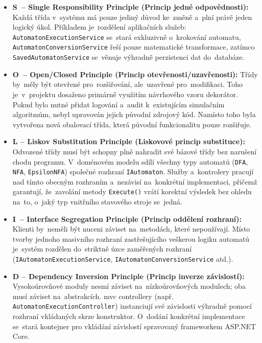 \documentclass[
  master,
  program=ainfvs,
  printversion,
  figures=false,
  tables=false,
  glossaries,
  index
]{kidiplom}
\begin{document}
\begin{itemize}
    \item \textbf{S~-- Single Responsibility Principle (Princip jedné odpovědnosti):} 
    Každá třída v~systému má pouze jediný důvod ke~změně a~plní právě jeden logický úkol. Příkladem je~rozdělení aplikačních služeb: \texttt{Au\-to\-ma\-ton\-Exe\-cution\-Service} se~stará exkluzivně o~krokování automatu, \texttt{Au\-to\-ma\-ton\-Con\-ver\-sion\-Service} řeší pouze matematické transformace, zatímco \texttt{Sa\-ved\-Au\-to\-ma\-ton\-Service} se~věnuje výhradně perzistenci dat do~databáze.

    \item \textbf{O~-- Open/Closed Principle (Princip otevřenosti/uzavřenosti):} 
    Třídy by~měly být otevřené pro~rozšiřování, ale~uzavřené pro~modifikaci. Toho je~v~projektu dosaženo primárně využitím návrhového vzoru dekorátor. Pokud bylo nutné přidat logování a~audit k~existujícím simulačním algoritmům, nebyl upravován jejich původní zdrojový kód. Namísto toho byla vytvořena nová obalovací třída, která původní funkcionalitu pouze rozšiřuje.

    \item \textbf{L -- Liskov Substitution Principle (Liskovové princip substituce):} 
    Odvozené třídy musí být schopny plně nahradit své bázové třídy bez narušení chodu programu. V~doménovém modelu sdílí všechny typy automatů (\texttt{DFA}, \texttt{NFA}, \texttt{EpsilonNFA}) společné rozhraní \texttt{IAutomaton}. Služby a~kontrolery pracují nad tímto obecným rozhraním a~nezávisí na~konkrétní implementaci, přičemž garantují, že~zavolání metody \texttt{Execute()} vrátí korektní výsledek bez ohledu na~to, o~jaký typ vnitřního stavového stroje se~jedná.

    \item \textbf{I~-- Interface Segregation Principle (Princip oddělení rozhraní):} 
    Klienti by~neměli být nuceni záviset na~metodách, které nepoužívají. Místo tvorby jednoho masivního rozhraní zastřešujícího veškerou logiku automatů je~systém rozdělen do~striktně úzce zaměřených rozhraní (\texttt{IAutomaton\-Execution\-Service}, \texttt{IAutomaton\-Conversion\-Service} atd.).

    \item \textbf{D -- Dependency Inversion Principle (Princip inverze závislostí):} 
    Vysokoúrovňové moduly nesmí záviset na~nízkoúrovňových modulech; oba musí záviset na~abstrakcích. \gls{mvc} controllery (např. \texttt{Automaton\-Exe\-cu\-ti\-on\-Con\-tro\-ller}) instanciují své závislosti výhradně pomocí rozhraní vkládaných skrze konstruktor. O~dodání konkrétní implementace se~stará kontejner pro vkládání závislostí spravovaný frameworkem ASP.NET Core.
\end{itemize}
\end{document}
